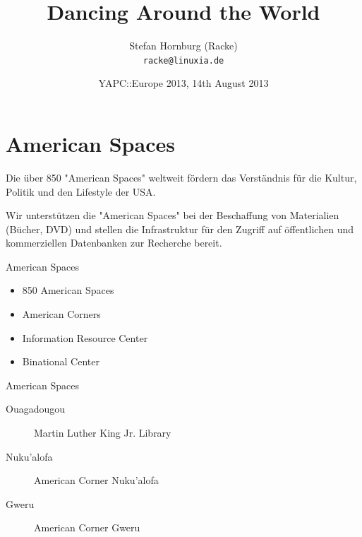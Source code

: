 \usepackage[utf8]{inputenc}
\usepackage[T1]{fontenc}
\usepackage{mathptmx}
\usepackage[scaled=.90]{helvet}
\usepackage{courier}
\usepackage{caption}
\captionsetup{labelformat=empty,labelsep=none}
\usepackage{beamerthemesplit}
\usepackage{verbatim}
\usepackage{hyperref}
\usepackage{listings}
\lstset{language=Perl,basicstyle=\normalsize,tabsize=3,showstringspaces=false}

\title{Dancing Around the World}
\author[racke]{Stefan Hornburg (Racke)\\ \texttt{racke@linuxia.de}}
\date{YAPC::Europe 2013, 14th August 2013}


\maketitle{}

\begin{frame}
  \titlepage
\end{frame}

\tableofcontents

\section{American Spaces}


Die über 850 "American Spaces" weltweit fördern das Verständnis für die Kultur, Politik und den Lifestyle der USA. 

Wir unterstützen die "American Spaces" bei der Beschaffung von Materialien
(Bücher, DVD) und stellen die Infrastruktur für den Zugriff auf öffentlichen
und kommerziellen Datenbanken zur Recherche bereit.

\begin{frame}{American Spaces}
\begin{itemize}
\item 850 American Spaces
\item American Corners
\item Information Resource Center
\item Binational Center

\end{itemize}
\end{frame}

\begin{frame}{American Spaces}
\begin{description}
\item[Ouagadougou] Martin Luther King Jr. Library
\item[Nuku'alofa] American Corner Nuku'alofa

\item[Gweru] American Corner Gweru

\end{description}
\end{frame}

